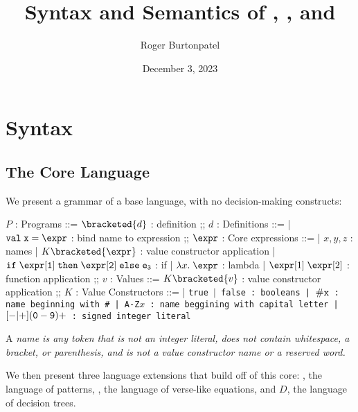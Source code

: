 \documentclass[]{article}
\title{Syntax and Semantics of \VMinus, \PPlus, and \D}
\author{Roger Burtonpatel}
\date{December 3, 2023}
\begin{document}
\maketitle

\section{Syntax}

\subsection{The Core Language}

We present a grammar of a base language, with no decision-making constructs: 

\bigskip

\begin{center}
    \begin{bnf}
    $P$ : \textsf{Programs} ::=
    $\bracketed{d}$ : definition
    ;;
    $d$ : \textsf{Definitions} ::=
    | $\tt{val} \; x \; \tt{=} \; \expr$ : bind name to expression
    ;;
    $\expr$ : Core expressions ::= 
    | $x, y, z$ : names
    | $K\bracketed{\expr}$ : value constructor application 
    | $\tt{if} \; \expr[1] \; \tt{then} \; \expr[2] \; \tt{else} \; e_{3} $ : if
    | $\lambda x. \; \expr$ : lambda 
    | $\expr[1] \; \expr[2]$ : function application 
    ;;
    $v$ : Values ::= $K\bracketed{v}$ : value constructor application 
    ;;
    $K$ : \textsf{Value Constructors} ::=
    | \tt{true} $\vert$ \tt{false} : booleans
    | $\tt{\#}x$ : name beginning with \tt{\#}
    | \tt{A-Z}$x$ : name beggining with capital letter
    | $[\tt{-}\vert\tt{+}](\tt{0}-\tt{9})+$ : signed integer literal 

    \end{bnf}
\end{center}


A \it{name} is any token that is not an integer literal, 
does not contain whitespace, a bracket, or parenthesis, 
and is not a value constructor name or a reserved word.


We then present three language extensions that build off of this core: 
\PPlus, the language of patterns, \VMinus, the language of 
verse-like equations, and $D$, the language of decision trees. 
\end{document}
